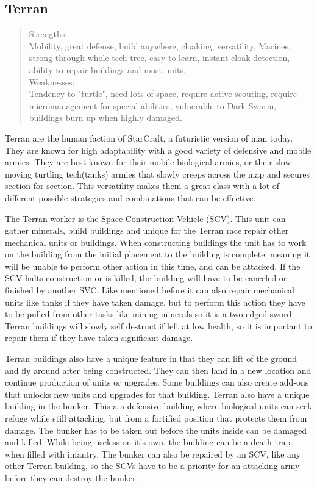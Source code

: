 \subsection{Terran}

\begin{quote}
Strengths: \\
Mobility, great defense, build anywhere, cloaking, versatility, Marines, strong through whole tech-tree, easy to learn, instant cloak detection, ability to repair buildings and most units. \\
Weaknesses: \\
Tendency to "turtle", need lots of space, require active scouting, require micromanagement for special abilities, vulnerable to Dark Swarm, buildings burn up when highly damaged. 


\cite{terranoverview}
\end{quote}

Terran are the human faction of StarCraft, a futuristic version of man today. They are known for high adaptability with a good variety of defensive and mobile armies. They are best known for their mobile biological armies, or their slow moving turtling tech(tanks) armies that slowly creeps across the map and secures section for section. This versatility makes them a great class with a lot of different possible strategies and combinations that can be effective. 

The Terran worker is the Space Construction Vehicle (SCV). This unit can gather minerals, build buildings and unique for the Terran race repair other mechanical units or buildings. When constructing buildings the unit has to work on the building from the initial placement to the building is complete, meaning it will be unable to perform other action in this time, and can be attacked. If the SCV halts construction or is killed, the building will have to be canceled or finished by another SVC. Like mentioned before it can also repair mechanical units like tanks if they have taken damage, but to perform this action they have to be pulled from other tasks like mining minerals so it is a two edged sword. Terran buildings will slowly self destruct if left at low health, so it is important to repair them if they have taken significant damage. 

Terran buildings also have a unique feature in that they can lift of the ground and fly around after being constructed. They can then land in a new location and continue production of units or upgrades. Some buildings can also create add-ons that unlocks new units and upgrades for that building. Terran also have a unique building in the bunker. This a a defensive building where  biological units can seek refuge while still attacking, but from a fortified position that protects them from damage. The bunker has to be taken out before the units inside can be damaged and killed. While being useless on it's own, the building can be a death trap when filled with infantry. The bunker can also be repaired by an SCV, like any other Terran building, so the SCVs have to be a priority for an attacking army before they can destroy the bunker. 

